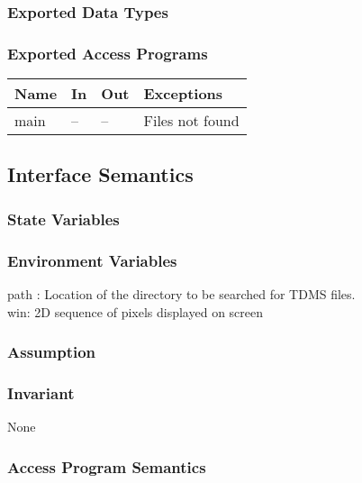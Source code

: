 \documentclass[12pt]{article}
\begin{document}

\subsubsection{Exported Data Types}

\subsubsection{Exported Access Programs}

\begin{center}
\begin{tabular}{l l l l}
\hline
\textbf{Name} & \textbf{In} & \textbf{Out} & \textbf{Exceptions} \\ \hline
main & -- & -- & Files not found\\
\hline
\end{tabular}
\end{center}


\subsection{Interface Semantics}

\subsubsection{State Variables}

\subsubsection{Environment Variables}
path : Location of the directory to be searched for TDMS files.\\
win: 2D sequence of pixels displayed on screen

\subsubsection{Assumption}
	

\subsubsection{Invariant}
None

\subsubsection{Access Program Semantics}
\end{document}

